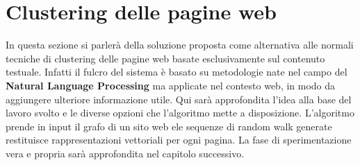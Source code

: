 \section{Clustering delle pagine web}
In questa sezione si parlerà della soluzione proposta come alternativa alle normali tecniche di clustering delle pagine web basate esclusivamente sul contenuto testuale. Infatti il fulcro del sistema è basato su metodologie nate nel campo del \textbf{Natural Language Processing} ma applicate nel contesto web, in modo da aggiungere ulteriore informazione utile. Qui sarà approfondita l'idea alla base del lavoro svolto e le diverse opzioni che l'algoritmo mette a disposizione. 
L'algoritmo prende in input il grafo di un sito web ele sequenze di random walk generate restituisce rappresentazioni vettoriali per ogni pagina.
La fase di sperimentazione vera e propria sarà approfondita nel capitolo successivo.

